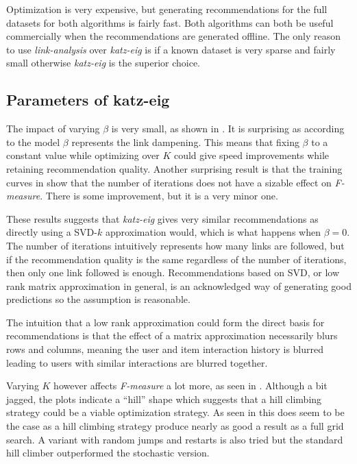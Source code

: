 Optimization is very expensive, but generating recommendations for the full datasets for both algorithms is fairly fast. Both algorithms can both be useful commercially when the recommendations are generated offline. The only reason to use \textit{link-analysis} over \textit{katz-eig} is if a known dataset is very sparse and fairly small otherwise \textit{katz-eig} is the superior choice.

\subsection{Parameters of katz-eig}

The impact of varying $\beta$ is very small, as shown in . It is surprising as according to the model $\beta$ represents the link dampening.  This means that fixing $\beta$ to a constant value while optimizing over $K$ could give speed improvements while retaining recommendation quality. Another surprising result is that the training curves in  show that the number of iterations does not have a sizable effect on \textit{F-measure}. There is some improvement, but it is a very minor one.

These results suggests that \textit{katz-eig} gives very similar recommendations as directly using a SVD-$k$ approximation would, which is what happens when $\beta = 0$. The number of iterations intuitively represents how many links are followed, but if the recommendation quality is the same regardless of the number of iterations, then only one link followed is enough. Recommendations based on SVD, or low rank matrix approximation in general, is an acknowledged way of generating good predictions \citep{bobadilla2013recommender, lu2012recommender} so the assumption is reasonable.

The intuition that a low rank approximation could form the direct basis for recommendations is that the effect of a matrix approximation necessarily blurs rows and columns, meaning the user and item interaction history is blurred leading to users with similar interactions are blurred together.

Varying $K$ however affects \textit{F-measure} a lot more, as seen in . Although a bit jagged, the plots indicate a ``hill'' shape which suggests that a hill climbing strategy could be a viable optimization strategy. As seen in  this does seem to be the case as a hill climbing strategy produce nearly as good a result as a full grid search. A variant with random jumps and restarts is also tried but the standard hill climber outperformed the stochastic version.

